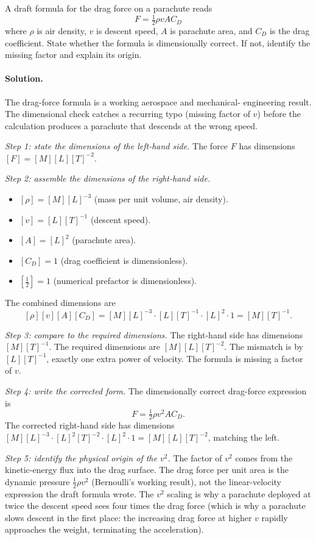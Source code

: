 \begin{exercise}
A draft formula for the drag force on a parachute reads
\[
F = \tfrac{1}{2} \rho v A C_{D}
\]
where $\rho$ is air density, $v$ is descent speed, $A$ is parachute
area, and $C_{D}$ is the drag coefficient. State whether the formula
is dimensionally correct. If not, identify the missing factor and
explain its origin.

\paragraph{Solution.}
The drag-force formula is a working aerospace and mechanical-
engineering result. The dimensional check catches a recurring
typo (missing factor of $v$) before the calculation produces a
parachute that descends at the wrong speed.

\emph{Step 1: state the dimensions of the left-hand side.} The
force $F$ has dimensions $[F] = [M][L][T]^{-2}$.

\emph{Step 2: assemble the dimensions of the right-hand side.}
\begin{itemize}[leftmargin=*]
  \item $[\rho] = [M][L]^{-3}$ (mass per unit volume, air density).
  \item $[v] = [L][T]^{-1}$ (descent speed).
  \item $[A] = [L]^{2}$ (parachute area).
  \item $[C_{D}] = 1$ (drag coefficient is dimensionless).
  \item $[\tfrac{1}{2}] = 1$ (numerical prefactor is dimensionless).
\end{itemize}
The combined dimensions are
\[
[\rho][v][A][C_{D}] = [M][L]^{-3} \cdot [L][T]^{-1} \cdot [L]^{2}
\cdot 1 = [M][T]^{-1}.
\]

\emph{Step 3: compare to the required dimensions.} The right-hand
side has dimensions $[M][T]^{-1}$. The required dimensions are
$[M][L][T]^{-2}$. The mismatch is by $[L][T]^{-1}$, exactly one
extra power of velocity. The formula is missing a factor of $v$.

\emph{Step 4: write the corrected form.} The dimensionally correct
drag-force expression is
\[
F = \tfrac{1}{2} \rho v^{2} A C_{D}.
\]
The corrected right-hand side has dimensions $[M][L]^{-3} \cdot
[L]^{2}[T]^{-2} \cdot [L]^{2} \cdot 1 = [M][L][T]^{-2}$, matching
the left.

\emph{Step 5: identify the physical origin of the $v^{2}$.} The
factor of $v^{2}$ comes from the kinetic-energy flux into the drag
surface. The drag force per unit area is the dynamic pressure
$\tfrac{1}{2}\rho v^{2}$ (Bernoulli's working result), not the
linear-velocity expression the draft formula wrote. The $v^{2}$
scaling is why a parachute deployed at twice the descent speed
sees four times the drag force (which is why a parachute slows
descent in the first place: the increasing drag force at higher
$v$ rapidly approaches the weight, terminating the acceleration).


\end{exercise}

